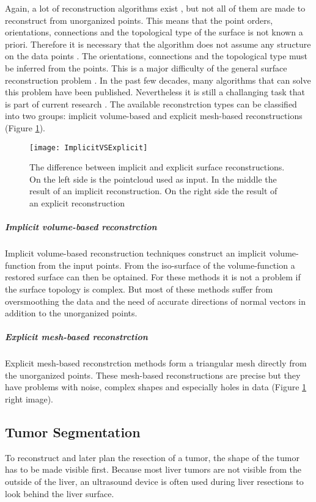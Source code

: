 Again, a lot of reconstruction algorithms exist \cite{lim2014surface}, but not
all of them are made to reconstruct from unorganized points. This means
that the point orders, orientations, connections and the topological type of the
surface is not known a priori. Therefore it is necessary that the algorithm does not assume any structure
on the data points \cite{hornung2006robust} \cite{yu1999surface}. The orientations, connections and the topological
type must be inferred from the points. This is a major difficulty of the general surface
reconstruction problem \cite{hoppe1992surface}. In the past few decades, many
algorithms that can solve this problem have been published. Nevertheless it is
still a challanging task that is part of current research \cite{li2018surface}.
The available reconstrction types can be classified into two groups: implicit
volume-based and explicit mesh-based reconstructions (Figure \ref{fig:ImplicitVSExplicit}).
\begin{figure}[H]
  \centering
 \texttt{[image: ImplicitVSExplicit]}
 \caption{The difference between implicit and explicit surface reconstructions.
   On the left side is the pointcloud used as input. In the middle the result of an
   implicit reconstruction. On the right side the result of an explicit
   reconstruction \cite{stanfordPP}}
  \label{fig:ImplicitVSExplicit}
\end{figure}
\subparagraph{Implicit volume-based reconstrction}
Implicit volume-based reconstruction techniques construct an implicit
volume-function from the input points. From the iso-surface of the
volume-function a restored surface can then be optained. For these methods it is
not a problem if the surface topology is complex. But most of these methods
suffer from oversmoothing the data and the need of accurate directions of normal
vectors in addition to the unorganized points. 
\subparagraph{Explicit mesh-based reconstrction}
Explicit mesh-based reconstrction methods form a triangular mesh directly from
the unorganized points. These mesh-based reconstructions are precise but they
have problems with noise, complex shapes and especially holes in data (Figure
\ref{fig:ImplicitVSExplicit} right image).
\subsection{Tumor Segmentation}
To reconstruct and later plan the resection of a tumor, the shape
of the tumor has to be made visible first. Because most liver tumors are not visible from the outside of the liver, an
ultrasound device is often used during liver resections to look behind the
liver surface.

